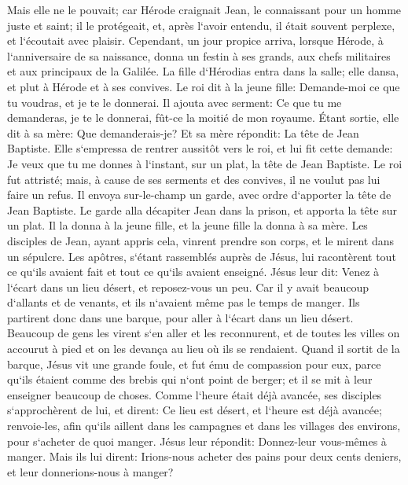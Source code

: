 \verse Mais elle ne le pouvait; car Hérode craignait Jean, le connaissant pour un homme juste et saint; il le protégeait, et, après l`avoir entendu, il était souvent perplexe, et l`écoutait avec plaisir. 
\verse Cependant, un jour propice arriva, lorsque Hérode, à l`anniversaire de sa naissance, donna un festin à ses grands, aux chefs militaires et aux principaux de la Galilée. 
\verse La fille d`Hérodias entra dans la salle; elle dansa, et plut à Hérode et à ses convives. Le roi dit à la jeune fille: Demande-moi ce que tu voudras, et je te le donnerai. 
\verse Il ajouta avec serment: Ce que tu me demanderas, je te le donnerai, fût-ce la moitié de mon royaume. 
\verse Étant sortie, elle dit à sa mère: Que demanderais-je? Et sa mère répondit: La tête de Jean Baptiste. 
\verse Elle s`empressa de rentrer aussitôt vers le roi, et lui fit cette demande: Je veux que tu me donnes à l`instant, sur un plat, la tête de Jean Baptiste. 
\verse Le roi fut attristé; mais, à cause de ses serments et des convives, il ne voulut pas lui faire un refus. 
\verse Il envoya sur-le-champ un garde, avec ordre d`apporter la tête de Jean Baptiste. 
\verse Le garde alla décapiter Jean dans la prison, et apporta la tête sur un plat. Il la donna à la jeune fille, et la jeune fille la donna à sa mère. 
\verse Les disciples de Jean, ayant appris cela, vinrent prendre son corps, et le mirent dans un sépulcre. 
\verse Les apôtres, s`étant rassemblés auprès de Jésus, lui racontèrent tout ce qu`ils avaient fait et tout ce qu`ils avaient enseigné. 
\verse Jésus leur dit: Venez à l`écart dans un lieu désert, et reposez-vous un peu. Car il y avait beaucoup d`allants et de venants, et ils n`avaient même pas le temps de manger. 
\verse Ils partirent donc dans une barque, pour aller à l`écart dans un lieu désert. 
\verse Beaucoup de gens les virent s`en aller et les reconnurent, et de toutes les villes on accourut à pied et on les devança au lieu où ils se rendaient. 
\verse Quand il sortit de la barque, Jésus vit une grande foule, et fut ému de compassion pour eux, parce qu`ils étaient comme des brebis qui n`ont point de berger; et il se mit à leur enseigner beaucoup de choses. 
\verse Comme l`heure était déjà avancée, ses disciples s`approchèrent de lui, et dirent: Ce lieu est désert, et l`heure est déjà avancée; 
\verse renvoie-les, afin qu`ils aillent dans les campagnes et dans les villages des environs, pour s`acheter de quoi manger. 
\verse Jésus leur répondit: Donnez-leur vous-mêmes à manger. Mais ils lui dirent: Irions-nous acheter des pains pour deux cents deniers, et leur donnerions-nous à manger? 
